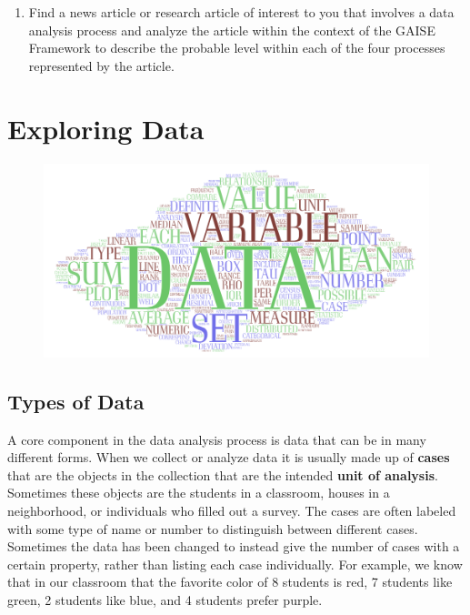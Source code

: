 \documentclass[
]{book}
\providecommand{\tightlist}{%
  \setlength{\itemsep}{0pt}\setlength{\parskip}{0pt}}
\theoremstyle{definition}
\theoremstyle{definition}
\theoremstyle{definition}
\theoremstyle{definition}
\theoremstyle{remark}
\begin{document}
\begin{enumerate}
  \begin{enumerate}
  \def\labelenumii{\alph{enumii}.}
  \tightlist
  \item
    From 2017-2019 the information about fatal police shootings\footnote{\url{https://www.statista.com/statistics/585152/people-shot-to-death-by-us-police-by-race/} retrieved August 1, 2020} indicated that 1,226 white people, 667 black people, and 485 Hispanic people were fatally shot by police. A person concludes that a white person is more likely to be fatally shot by police than a black person.
  \end{enumerate}
\item
  Find a news article or research article of interest to you that involves a data analysis process and analyze the article within the context of the GAISE Framework to describe the probable level within each of the four processes represented by the article.
\end{enumerate}

\hypertarget{data-explore}{%
\chapter{Exploring Data}\label{data-explore}}

\begin{figure}

{\centering \includegraphics[width=0.9\linewidth]{images/DataWordArt} 

}

\end{figure}

\hypertarget{types-of-data}{%
\section{Types of Data}\label{types-of-data}}

A core component in the data analysis process is data that can be in many different forms. When we collect or analyze data it is usually made up of \textbf{cases} that are the objects in the collection that are the intended \textbf{unit of analysis}. Sometimes these objects are the students in a classroom, houses in a neighborhood, or individuals who filled out a survey. The cases are often labeled with some type of name or number to distinguish between different cases. Sometimes the data has been changed to instead give the number of cases with a certain property, rather than listing each case individually. For example, we know that in our classroom that the favorite color of 8 students is red, 7 students like green, 2 students like blue, and 4 students prefer purple.
\end{document}
